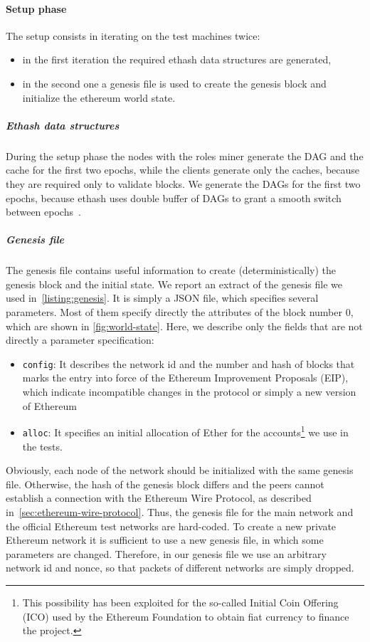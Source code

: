 \paragraph{Setup phase}
The setup consists in iterating on the test machines twice:
\begin{itemize}
  \item in the first iteration the required ethash data structures are 
  generated,
  \item in the second one a genesis file is used to create the genesis block 
  and initialize the ethereum  world state.
\end{itemize}


\subparagraph{Ethash data structures}
During the setup phase the nodes with the roles miner generate the DAG and the
cache for the first two epochs, while the clients generate only the caches,
because they are required only to validate blocks. We generate the DAGs for the
first two epochs, because ethash uses double buffer of DAGs to grant a smooth
switch between epochs~\cite{bib:dagger-hashimoto}.

\subparagraph{Genesis file}
The genesis file contains useful information to create (deterministically) the
genesis block and the initial state. We report an extract of the genesis file
we used in~\autoref{listing:genesis}. It is simply a JSON file, which specifies
several parameters. Most of them specify directly the attributes of the block
number $0$, which are shown in \autoref{fig:world-state}. Here, we describe
only the fields that are not directly a parameter specification:
\begin{itemize}
    \item \texttt{config}: It describes the network id and the number and hash
    of blocks that marks the entry into force of the Ethereum Improvement 
    Proposals (EIP), which indicate incompatible changes in the protocol or
    simply a new version of Ethereum
    \item \texttt{alloc}: It specifies an initial allocation of Ether for the
    accounts\footnote{This possibility has been exploited for the so-called
    Initial Coin Offering (ICO) used by the Ethereum Foundation to obtain fiat 
    currency to finance the project.} we use in the tests.
\end{itemize}
Obviously, each node of the network should be initialized with the same genesis 
file. Otherwise, the hash of the genesis block differs and the peers cannot
establish a connection with the Ethereum Wire Protocol, as described
in~\autoref{sec:ethereum-wire-protocol}. Thus, the genesis file for the main 
network  and the official Ethereum test networks are hard-coded. To create a 
new private Ethereum network it is sufficient to use a new genesis file, in 
which some parameters are changed. Therefore, in our genesis file we use an 
arbitrary network id and nonce, so that packets of different networks are 
simply dropped.

